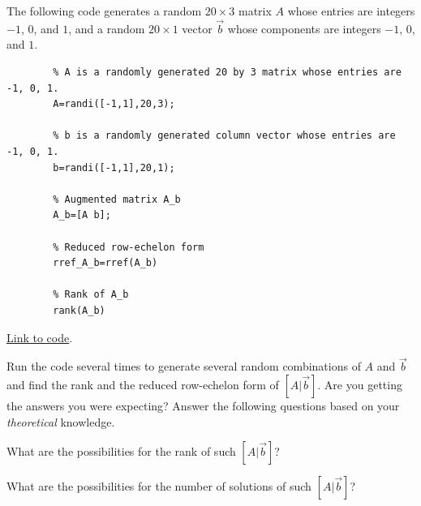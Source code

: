 \documentclass{ximera}
\begin{document}
\begin{problem}\label{prob_oct_sys_3}
    The following code generates a random $20\times 3$ matrix $A$ whose entries are integers $-1$, $0$, and $1$, and a random $20\times 1$ vector $\vec{b}$ whose components are integers $-1$, $0$, and $1$. 
 
    \begin{verbatim}
        % A is a randomly generated 20 by 3 matrix whose entries are -1, 0, 1.
        A=randi([-1,1],20,3);
         
        % b is a randomly generated column vector whose entries are -1, 0, 1.
        b=randi([-1,1],20,1);
         
        % Augmented matrix A_b
        A_b=[A b];
         
        % Reduced row-echelon form
        rref_A_b=rref(A_b)
         
        % Rank of A_b
        rank(A_b)
    \end{verbatim}
 
    \href{https://sagecell.sagemath.org/?z=eJx9jr0OgkAQhHsS3mEaEknAgJbG4l7BlhByB4sQubtkAX_e3kWxMtrtz8w3E0GhH6HB2jXeDg-cyRHriRrsMpgH9rB64v6OW-dHAjlZSBxMSPMEWYJ8GwbquAD6TSG3vEx2WbKPD2EQBhHMz4DaD7N1uFI9ef7PN1_8_MNX89mKS3hrUVUZKVSZY6FgylV1omauRcP-llLd0eAdWs82DJiprRb5MmxkiFeHdhf49o2T9Mvr9wQYpVrl&lang=octave&interacts=eJyLjgUAARUAuQ==}{Link to code}.
     
    Run the code several times to generate several random combinations of $A$ and $\vec{b}$ and find the rank and the reduced row-echelon form of $[A | \vec{b}]$.  Are you getting the answers you were expecting?  Answer the following questions based on your \emph{theoretical} knowledge.
 
    What are the possibilities for the rank of such $[A | \vec{b}]$? 
 
    \begin{multipleChoice}
    \end{multipleChoice}
 
    What are the possibilities for the number of solutions of such $[A | \vec{b}]$?
 
    \begin{multipleChoice}
    \end{multipleChoice}
 

\end{problem}
\end{document}
